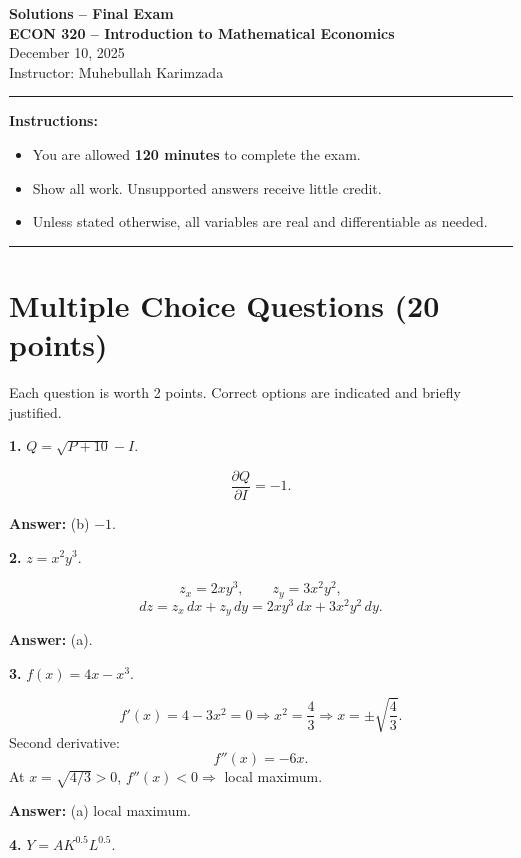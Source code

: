 \documentclass[12pt]{article}
\begin{document}
\begin{center}
{\Large \textbf{Solutions -- Final Exam}} \\[0.9em]
\textbf{ECON 320 -- Introduction to Mathematical Economics} \\[0.7em]

December 10, 2025
 \\[0.8em]
Instructor: Muhebullah Karimzada
\end{center}

\hrule

\textbf{Instructions:}
\begin{itemize}
\item You are allowed \textbf{120 minutes} to complete the exam.
    \item Show all work. Unsupported answers receive little credit.

    \item Unless stated otherwise, all variables are real and differentiable as needed.
\end{itemize}

\hrule
\section*{Multiple Choice Questions (20 points)}

Each question is worth 2 points. Correct options are indicated and briefly justified.

\textbf{1.} \(Q = \sqrt{P+10} - I\).

\[
\frac{\partial Q}{\partial I} = -1.
\]

\textbf{Answer:} (b) \(-1\).

\medskip

\textbf{2.} \(z = x^2 y^3\).

\[
z_x = 2x y^3,\qquad z_y = 3x^2 y^2,
\]
\[
dz = z_x\,dx + z_y\,dy = 2x y^3\,dx + 3x^2 y^2\,dy.
\]

\textbf{Answer:} (a).

\medskip

\textbf{3.} \(f(x)=4x - x^3\).

\[
f'(x)=4 - 3x^2 = 0 \Rightarrow x^2=\frac{4}{3} \Rightarrow x=\pm \sqrt{\frac{4}{3}}.
\]
Second derivative:
\[
f''(x) = -6x.
\]
At \(x=\sqrt{4/3}>0\), \(f''(x) < 0 \Rightarrow\) local maximum.

\textbf{Answer:} (a) local maximum.

\medskip

\textbf{4.} \(Y = A K^{0.5} L^{0.5}\).
\end{document}
